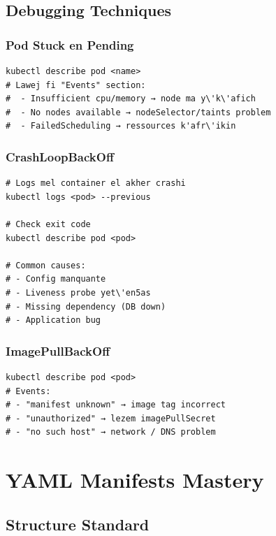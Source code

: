 \documentclass[11pt,a4paper]{book}
\begin{document}
\section{Debugging Techniques}

\subsection{Pod Stuck en Pending}

\begin{lstlisting}
kubectl describe pod <name>
# Lawej fi "Events" section:
#  - Insufficient cpu/memory → node ma y\'k\'afich
#  - No nodes available → nodeSelector/taints problem
#  - FailedScheduling → ressources k'afr\'ikin
\end{lstlisting}

\subsection{CrashLoopBackOff}

\begin{lstlisting}
# Logs mel container el akher crashi
kubectl logs <pod> --previous

# Check exit code
kubectl describe pod <pod>

# Common causes:
# - Config manquante
# - Liveness probe yet\'en5as
# - Missing dependency (DB down)
# - Application bug
\end{lstlisting}

\subsection{ImagePullBackOff}

\begin{lstlisting}
kubectl describe pod <pod>
# Events:
# - "manifest unknown" → image tag incorrect
# - "unauthorized" → lezem imagePullSecret
# - "no such host" → network / DNS problem
\end{lstlisting}

\cleardoublepage

\chapter{YAML Manifests Mastery}

\section{Structure Standard}
\end{document}
